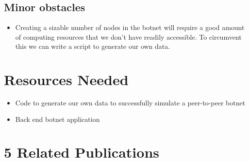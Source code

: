 \documentclass{proc}
\begin{document}
\subsection{Minor obstacles}

\begin{itemize}
\item Creating a sizable number of nodes in the botnet will require a good amount of computing resources that we don't have readily accessible. To circumvent this we can write a script to generate our own data. 
\end{itemize}
\section{Resources Needed}
\begin{itemize}
\item Code to generate our own data to successfully simulate a peer-to-peer botnet
\item Back end botnet application
\end{itemize}

\section{5 Related Publications}
\end{document}
